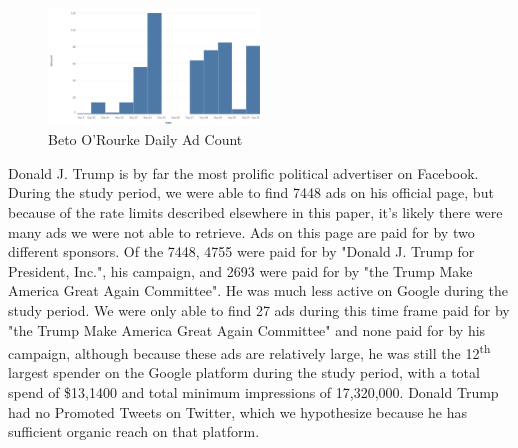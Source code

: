 \documentclass[fleqn,10pt]{wlscirep}
\begin{document}
\begin{figure}
    \centering
    \includegraphics[width=0.5\textwidth]{beto_ads_by_day.png}
    \caption{Beto O'Rourke Daily Ad Count}
    \label{fig:beto_ads_by_day}
\end{figure}

Donald J. Trump is by far the most prolific political advertiser on Facebook. During the study period, we were able to find 7448 ads on his official page, but because of the rate limits described elsewhere in this paper, it's likely there were many ads we were not able to retrieve. Ads on this page are paid for by two different sponsors. Of the 7448, 4755 were paid for by "Donald J. Trump for President, Inc.", his campaign, and 2693 were paid for by "the Trump Make America Great Again Committee". He was much less active on Google during the study period. We were only able to find 27 ads during this time frame paid for by "the Trump Make America Great Again Committee" and none paid for by his campaign, although because these ads are relatively large, he was still the 12\textsuperscript{th} largest spender on the Google platform during the study period, with a total spend of \$13,1400 and total minimum impressions of 17,320,000. Donald Trump had no Promoted Tweets on Twitter, which we hypothesize because he has sufficient organic reach on that platform. 
\end{document}
